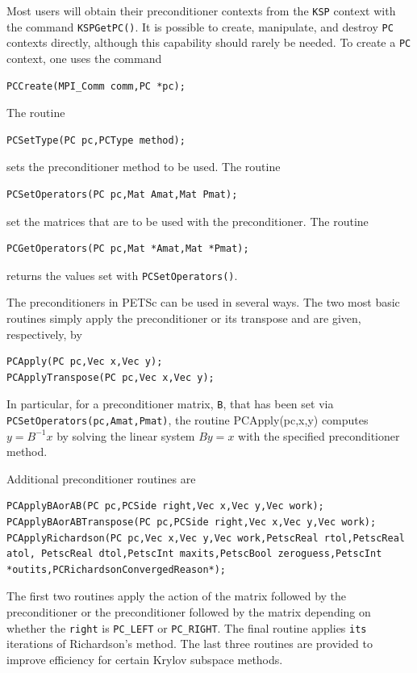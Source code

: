 {{Most users will obtain their preconditioner contexts from the \lstinline{KSP}
context with the command \lstinline{KSPGetPC()}. It is possible to create,
manipulate, and destroy \lstinline{PC} contexts directly, although this capability
should rarely be needed. To create a \lstinline{PC} context, one uses the command
\begin{lstlisting}
PCCreate(MPI_Comm comm,PC *pc);
\end{lstlisting}
The routine
\begin{lstlisting}
PCSetType(PC pc,PCType method);
\end{lstlisting}
sets the preconditioner method to be used.
The routine
\begin{lstlisting}
PCSetOperators(PC pc,Mat Amat,Mat Pmat);
\end{lstlisting}
set the matrices that are to be used with
the preconditioner.
The routine
\begin{lstlisting}
PCGetOperators(PC pc,Mat *Amat,Mat *Pmat);
\end{lstlisting}
returns the values set with \lstinline{PCSetOperators()}.

The preconditioners in PETSc can be used in several ways.  The two
most basic routines simply apply the preconditioner or its transpose
and are given, respectively, by
\begin{lstlisting}
PCApply(PC pc,Vec x,Vec y);
PCApplyTranspose(PC pc,Vec x,Vec y);
\end{lstlisting}
In particular, for a preconditioner matrix, \lstinline{B}, that has
been set via \lstinline{PCSetOperators(pc,Amat,Pmat)},
the routine PCApply(pc,x,y) computes $y = B^{-1} x$
by solving the linear system $By = x$ with the specified preconditioner
method.

Additional preconditioner routines are
\begin{lstlisting}
PCApplyBAorAB(PC pc,PCSide right,Vec x,Vec y,Vec work);
PCApplyBAorABTranspose(PC pc,PCSide right,Vec x,Vec y,Vec work);
PCApplyRichardson(PC pc,Vec x,Vec y,Vec work,PetscReal rtol,PetscReal atol, PetscReal dtol,PetscInt maxits,PetscBool zeroguess,PetscInt *outits,PCRichardsonConvergedReason*);
\end{lstlisting}
The first two routines apply the action of the matrix followed by the
preconditioner or the preconditioner followed by the matrix depending
on whether the  \lstinline{right} is
\lstinline{PC_LEFT} or \lstinline{PC_RIGHT}. The final routine applies \lstinline{its} iterations of
Richardson's method.   
The last three routines are provided to improve
efficiency for certain Krylov subspace methods.

}}
